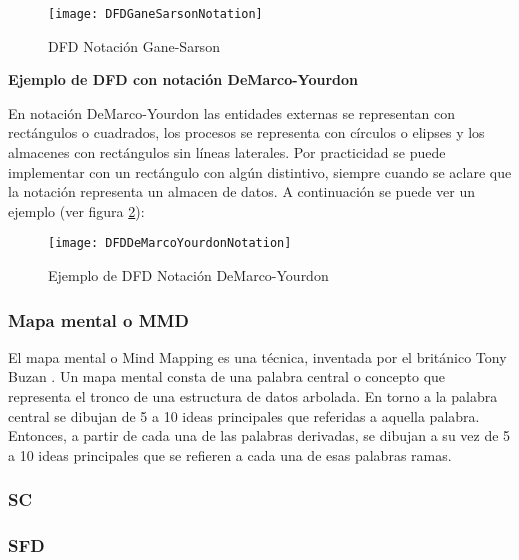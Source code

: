 \begin{figure}[h]
  \centering
  \texttt{[image: DFDGaneSarsonNotation]}
  \caption{DFD Notación Gane-Sarson \cite{Gane-Sarson-1979}}
  \centering
  \label{fig:DFDGaneSarsonNotation} %
\end{figure}

\textbf{Ejemplo de DFD con notación DeMarco-Yourdon}

En notación DeMarco-Yourdon las entidades externas se representan con rectángulos o cuadrados, los procesos se representa con círculos o elipses y los almacenes con rectángulos sin líneas laterales. Por practicidad se puede implementar con un rectángulo con algún distintivo, siempre cuando se aclare que la notación representa un almacen de datos. A continuación se puede ver un ejemplo (ver figura \ref{fig:DFDDeMarcoYourdonNotation}):\newline
\newline

\begin{figure}[h]
  \centering
  \texttt{[image: DFDDeMarcoYourdonNotation]}
  \caption{Ejemplo de DFD Notación DeMarco-Yourdon \cite{Dixit-2007}}
  \centering
  \label{fig:DFDDeMarcoYourdonNotation} %
\end{figure}


\subsubsection{Mapa mental o MMD}

El mapa mental o Mind Mapping es una técnica, inventada por el británico Tony Buzan \cite{Tony-Buzan-2004}. Un mapa mental consta de una palabra central o concepto que representa el tronco de una estructura de datos arbolada. En torno a la palabra central se dibujan de 5 a 10 ideas principales que referidas a aquella palabra. Entonces, a partir de cada una de las palabras derivadas, se dibujan a su vez de 5 a 10 ideas principales que se refieren a cada una de esas palabras ramas.

\subsubsection{SC}

\subsubsection{SFD}

